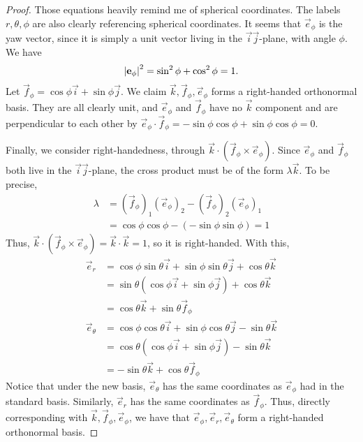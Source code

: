 \documentclass[12pt]{article}
\begin{document}
    \begin{proof}
        Those equations heavily remind me of spherical coordinates.
        The labels $r,\theta,\phi$ are also clearly referencing spherical coordinates.
        It seems that $\vec{e}_\phi$ is the yaw vector,
        since it is simply a unit vector living in the $\vec{i}\vec{j}$-plane,
        with angle $\phi$. We have
        \[
            \left\lvert \mathbf{e}_\phi \right\rvert^{2} = \sin^{2}\phi+\cos^{2}\phi = 1.
        \]
        Let $\vec{f}_\phi = \cos\phi\vec{i}+\sin\phi\vec{j}$.
        We claim $\vec{k},\vec{f}_\phi,\vec{e}_\phi$ forms a right-handed orthonormal basis.
        They are all clearly unit, and $\vec{e}_\phi$ and $\vec{f}_\phi$
        have no $\vec{k}$ component and are perpendicular to each other by
        $\vec{e}_\phi\cdot\vec{f}_\phi = -\sin\phi\cos\phi+\sin\phi\cos\phi = 0$.

        Finally, we consider right-handedness, through
        $\vec{k}\cdot(\vec{f}_\phi\times\vec{e}_\phi)$.
        Since $\vec{e}_\phi$ and $\vec{f}_\phi$ both live
        in the $\vec{i}\vec{j}$-plane, the cross product must be of the form $\lambda\vec{k}$.
        To be precise, 
        \begin{align*}
            \lambda 
            &= (\vec{f}_\phi)_1(\vec{e}_\phi)_2 - (\vec{f}_\phi)_2(\vec{e}_\phi)_1\\
            &= \cos\phi\cos\phi - (-\sin\phi\sin\phi) = 1
        \end{align*}
        Thus, $\vec{k}\cdot(\vec{f}_\phi\times\vec{e}_\phi) = \vec{k}\cdot\vec{k} = 1$,
        so it is right-handed.
        With this,
        \begin{align*}
            \vec{e}_r 
            &= \cos\phi\sin\theta\vec{i}+\sin\phi\sin\theta\vec{j}+\cos\theta\vec{k}\\
            &= \sin\theta(\cos\phi\vec{i}+\sin\phi\vec{j})+\cos\theta\vec{k}\\
            &= \cos\theta\vec{k}+\sin\theta\vec{f}_\phi\\
            \vec{e}_\theta 
            &= \cos\phi\cos\theta\vec{i}+\sin\phi\cos\theta\vec{j}-\sin\theta\vec{k}\\
            &= \cos\theta(\cos\phi\vec{i}+\sin\phi\vec{j})-\sin\theta\vec{k}\\
            &= -\sin\theta\vec{k}+\cos\theta\vec{f}_\phi
        \end{align*}
        Notice that under the new basis, $\vec{e}_\theta$ has
        the same coordinates as $\vec{e}_\phi$ had in the standard basis.
        Similarly, $\vec{e}_r$ has the same coordinates as $\vec{f}_\phi$.
        Thus, directly
        corresponding with $\vec{k},\vec{f}_\phi,\vec{e}_\phi$,
        we have that 
        $\vec{e}_\phi,\vec{e}_r,\vec{e}_\theta$
        form a right-handed orthonormal basis.


\end{proof}
\end{document}
